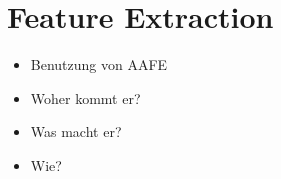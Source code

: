 \section{Feature Extraction}

\begin{itemize}
	\item Benutzung von AAFE
    \item Woher kommt er?
    \item Was macht er?
    \item Wie?
\end{itemize}



